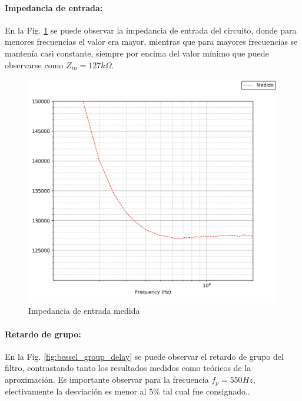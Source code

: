 \paragraph{Impedancia de entrada:} En la Fig. \ref{bessel_impedancia_entrada} se puede observar la impedancia de entrada del circuito, donde para menores frecuencias
el valor era mayor, mientras que para mayores frecuencias se manten\'ia casi constante, siempre por encima del valor m\'inimo que puede observarse como $Z_{in} = 127k\Omega$.

\begin{figure}[H]
    \centering
    \includegraphics[scale=0.1]{../EJ1/Recursos/bessel_impedancia_entrada.png}
    \caption{Impedancia de entrada medida}
    \label{bessel_impedancia_entrada}
\end{figure}

\paragraph{Retardo de grupo:} En la Fig. \ref{fig:bessel_group_delay} se puede observar el retardo de grupo del filtro, contrastando tanto los resultados medidos como te\'oricos de la aproximaci\'on.
Es importante observar para la frecuencia $f_p = 550Hz$, efectivamente la desviaci\'on es menor al $5\%$ tal cual fue consignado..

